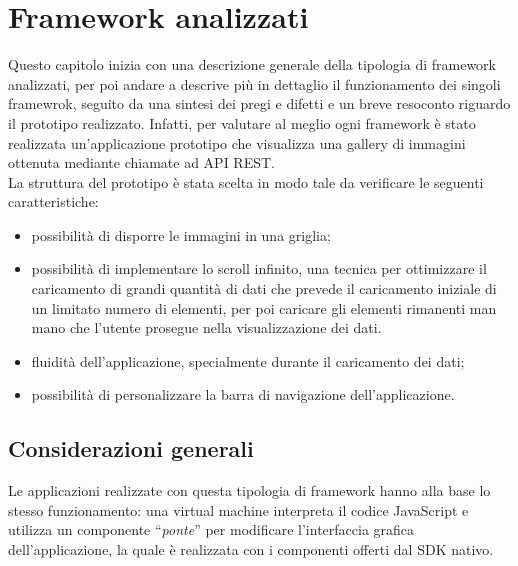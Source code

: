 
\chapter{Framework analizzati}
\label{cap:framework-analizzati}
Questo capitolo inizia con una descrizione generale della tipologia di framework analizzati, per poi andare a descrive più in dettaglio il funzionamento dei singoli framewrok, seguito da una sintesi dei pregi e difetti e un breve resoconto riguardo il prototipo realizzato.
Infatti, per valutare al meglio ogni framework è stato realizzata un'applicazione prototipo che visualizza una gallery di immagini ottenuta mediante chiamate ad \gls{API} \gls{REST}.\\
La struttura del prototipo è stata scelta in modo tale da verificare le seguenti caratteristiche:
\begin{itemize}
\item possibilità di disporre le immagini in una griglia;
\item possibilità di implementare lo scroll infinito, una tecnica per ottimizzare il caricamento di grandi quantità di dati che prevede il caricamento iniziale di un limitato numero di elementi, per poi caricare gli elementi rimanenti man mano che l'utente prosegue nella visualizzazione dei dati.
\item fluidità dell'applicazione, specialmente durante il caricamento dei dati;
\item possibilità di personalizzare la barra di navigazione dell'applicazione.
\end{itemize}


\section{Considerazioni generali}
Le applicazioni realizzate con questa tipologia di framework hanno alla base lo stesso funzionamento: una \gls{virtual machine} interpreta il codice JavaScript e utilizza un componente ``\textit{ponte}'' per modificare l'interfaccia grafica dell'applicazione, la quale è realizzata con i componenti offerti dal \gls{SDK} nativo.

